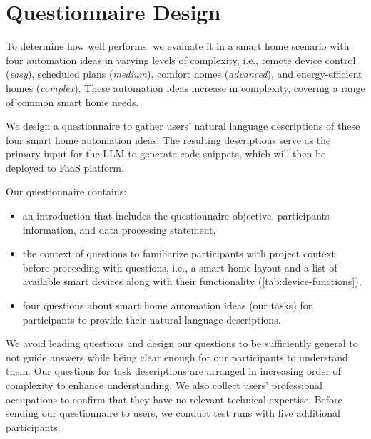 \appendix
\section{Questionnaire Design}
\label{sec:appendix:questionnaire}

To determine how well \sysname{} performs, we evaluate it in a smart home scenario with four automation ideas in varying levels of complexity, i.e., remote device control (\emph{easy}), scheduled plans (\emph{medium}), comfort homes (\emph{advanced}), and energy-efficient homes (\emph{complex}).
These automation ideas increase in complexity, covering a range of common smart home needs.


We design a questionnaire to gather users' natural language descriptions of these four smart home automation ideas.
The resulting descriptions serve as the primary input for the LLM to generate code snippets, which will then be deployed to FaaS platform.


Our questionnaire contains:
\begin{itemize}
    \item an introduction that includes the questionnaire objective, participants information, and data processing statement,
    \item the context of questions to familiarize participants with project context before proceeding with questions, i.e., a smart home layout and a list of available smart devices along with their functionality (\cref{tab:device-functions}),
    \item four questions about smart home automation ideas (our tasks) for participants to provide their natural language descriptions.
\end{itemize}

We avoid leading questions and design our questions to be sufficiently general to not guide answers while being clear enough for our participants to understand them.
Our questions for task descriptions are arranged in increasing order of complexity to enhance understanding.
We also collect users' professional occupations to confirm that they have no relevant technical expertise.
Before sending our questionnaire to users, we conduct test runs with five additional participants.



